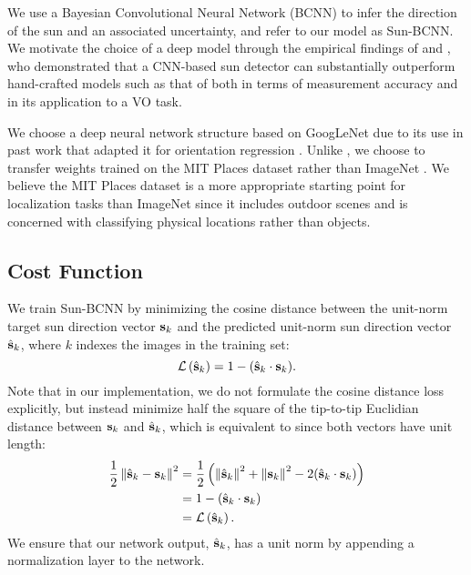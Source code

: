 We use a Bayesian Convolutional Neural Network (BCNN) to infer the direction of the sun and an associated uncertainty, and refer to our model as Sun-BCNN. 
We motivate the choice of a deep model through the empirical findings of \citet{2017_Clement_Improving} and \citet{Ma2016-at}, who demonstrated that a CNN-based sun detector can substantially outperform hand-crafted models such as that of \citet{Lalonde2011-jw} both in terms of measurement accuracy and in its application to a VO task.

We choose a deep neural network structure based on GoogLeNet \citep{Szegedy2015-uw} due to its use in past work that adapted it for orientation regression \citep{Kendall2016-zf,Kendall2015-ew}. 
Unlike \citet{Ma2016-at}, we choose to transfer weights trained on the MIT Places dataset \citep{zhou2014MITPlaces} rather than ImageNet \citep{deng2009imagenet}.
We believe the MIT Places dataset is a more appropriate starting point for localization tasks than ImageNet since it includes outdoor scenes and is concerned with classifying physical locations rather than objects.

\subsection{Cost Function}
We train Sun-BCNN by minimizing the cosine distance between the unit-norm target sun direction vector $\boldsymbol{\mathbf{s}}_k$  and the predicted unit-norm sun direction vector $\hat{\boldsymbol{\mathbf{s}}}_k$, where $k$ indexes the images in the training set:
\begin{equation}
	\mathcal{L}\left(\hat{\boldsymbol{\mathbf{s}}}_k\right) = 1 - (\hat{\boldsymbol{\mathbf{s}}}_k \cdot \boldsymbol{\mathbf{s}}_k).
	\label{eq:cnn_loss}
\end{equation}
Note that in our implementation, we do not formulate the cosine distance loss explicitly, but instead minimize half the square of the tip-to-tip Euclidian distance between $\boldsymbol{\mathbf{s}}_k$ and $\hat{\boldsymbol{\mathbf{s}}}_k$, which is equivalent to  since both vectors have unit length:
\begin{align*}
 	\frac{1}{2} \left\Vert\hat{\boldsymbol{\mathbf{s}}}_k  - \boldsymbol{\mathbf{s}}_k\right\Vert^2 &= \frac{1}{2} \left( \left\Vert\hat{\boldsymbol{\mathbf{s}}}_k\right\Vert^2 + \left\Vert\boldsymbol{\mathbf{s}}_k\right\Vert^2 - 2 (\hat{\boldsymbol{\mathbf{s}}}_k \cdot \boldsymbol{\mathbf{s}}_k) \right) \\
 		&= 1 - (\hat{\boldsymbol{\mathbf{s}}}_k \cdot \boldsymbol{\mathbf{s}}_k) \\
 		&= \mathcal{L}\left(\hat{\boldsymbol{\mathbf{s}}}_k\right).
\end{align*}
We ensure that our network output, $\hat{\boldsymbol{\mathbf{s}}}_k$, has a unit norm by appending a normalization layer to the network.

